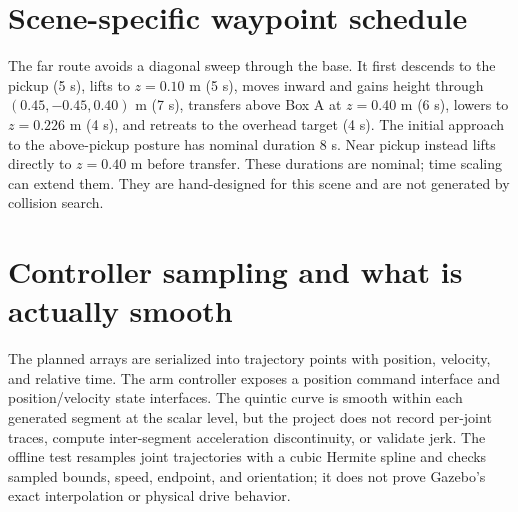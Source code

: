 \section{Scene-specific waypoint schedule}
The far route avoids a diagonal sweep through the base. It first descends to
the pickup (5 s), lifts to $z=0.10$ m (5 s), moves inward and gains height
through $(0.45,-0.45,0.40)$ m (7 s), transfers above Box A at $z=0.40$ m (6 s),
lowers to $z=0.226$ m (4 s), and retreats to the overhead target (4 s). The
initial approach to the above-pickup posture has nominal duration 8 s. Near
pickup instead lifts directly to $z=0.40$ m before transfer. These durations
are nominal; time scaling can extend them. They are hand-designed for this
scene and are not generated by collision search.

\section{Controller sampling and what is actually smooth}
The planned arrays are serialized into trajectory points with position,
velocity, and relative time. The arm controller exposes a position command
interface and position/velocity state interfaces. The quintic curve is smooth
within each generated segment at the scalar level, but the project does not
record per-joint traces, compute inter-segment acceleration discontinuity, or
validate jerk. The offline test resamples joint trajectories with a cubic
Hermite spline and checks sampled bounds, speed, endpoint, and orientation; it
does not prove Gazebo's exact interpolation or physical drive behavior.
